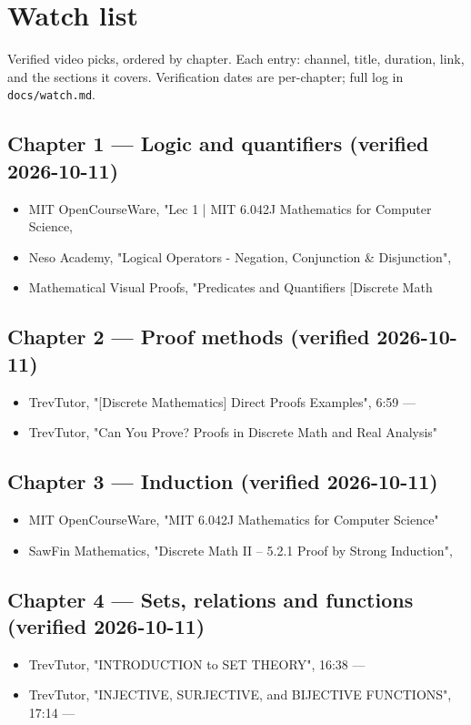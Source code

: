 \chapter*{Watch list}
Verified video picks, ordered by chapter. Each entry: channel, title,
duration, link, and the sections it covers. Verification dates are per-chapter;
full log in \texttt{docs/watch.md}.

\section*{Chapter 1 --- Logic and quantifiers (verified 2026-10-11)}
\begin{itemize}\setlength\itemsep{2pt}
  \item MIT OpenCourseWare, "Lec 1 | MIT 6.042J Mathematics for Computer Science,
  \item Neso Academy, "Logical Operators - Negation, Conjunction \& Disjunction",
  \item Mathematical Visual Proofs, "Predicates and Quantifiers [Discrete Math
\end{itemize}

\section*{Chapter 2 --- Proof methods (verified 2026-10-11)}
\begin{itemize}\setlength\itemsep{2pt}
  \item TrevTutor, "[Discrete Mathematics] Direct Proofs Examples", 6:59 ---
  \item TrevTutor, "Can You Prove? Proofs in Discrete Math and Real Analysis"
\end{itemize}

\section*{Chapter 3 --- Induction (verified 2026-10-11)}
\begin{itemize}\setlength\itemsep{2pt}
  \item MIT OpenCourseWare, "MIT 6.042J Mathematics for Computer Science"
  \item SawFin Mathematics, "Discrete Math II -- 5.2.1 Proof by Strong Induction",
\end{itemize}

\section*{Chapter 4 --- Sets, relations and functions (verified 2026-10-11)}
\begin{itemize}\setlength\itemsep{2pt}
  \item TrevTutor, "INTRODUCTION to SET THEORY", 16:38 ---
  \item TrevTutor, "INJECTIVE, SURJECTIVE, and BIJECTIVE FUNCTIONS", 17:14 ---
\end{itemize}

